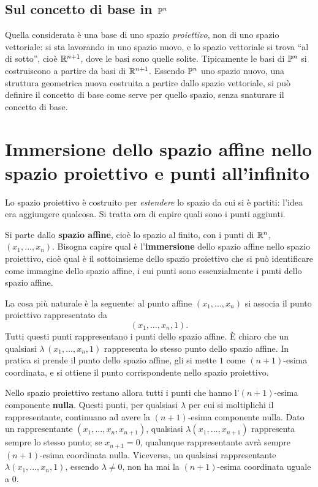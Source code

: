 \subsection{Sul concetto di base in $\mathbb{P}^n$}

Quella considerata è una base di uno spazio \emph{proiettivo}, non di uno spazio vettoriale: si sta lavorando in uno spazio nuovo, e lo spazio vettoriale si trova ``al di sotto'', cioè $\mathbb{R}^{n+1}$, dove le basi sono quelle solite. Tipicamente le basi di $\mathbb{P}^n$ si costruiscono a partire da basi di $\mathbb{R}^{n+1}$. Essendo $\mathbb{P}^n$ uno spazio nuovo, una struttura geometrica nuova costruita a partire dallo spazio vettoriale, si può definire il concetto di base come serve per quello spazio, senza snaturare il concetto di base.

\section{Immersione dello spazio affine nello spazio proiettivo e punti all'infinito}

Lo spazio proiettivo è costruito per \emph{estendere} lo spazio da cui si è partiti: l'idea era aggiungere qualcosa. Si tratta ora di capire quali sono i punti aggiunti.

Si parte dallo \textbf{spazio affine}, cioè lo spazio al finito, con i punti di $\mathbb{R}^n$, $(x_1,\dots,x_n)$. Bisogna capire qual è l'\textbf{immersione} dello spazio affine nello spazio proiettivo, cioè qual è il sottoinsieme dello spazio proiettivo che si può identificare come immagine dello spazio affine, i cui punti sono essenzialmente i punti dello spazio affine.

La cosa più naturale è la seguente: al punto affine $(x_1,\dots,x_n)$ si associa il punto proiettivo rappresentato da
\[
  (x_1,\dots,x_n,1).
\]
Tutti questi punti rappresentano i punti dello spazio affine. È chiaro che un qualsiasi $\lambda\,(x_1,\dots,x_n,1)$ rappresenta lo stesso punto dello spazio affine. In pratica si prende il punto dello spazio affine, gli si mette $1$ come $(n+1)$-esima coordinata, e si ottiene il punto corrispondente nello spazio proiettivo.

Nello spazio proiettivo restano allora tutti i punti che hanno l'$(n+1)$-esima componente \textbf{nulla}. Questi punti, per qualsiasi $\lambda$ per cui si moltiplichi il rappresentante, continuano ad avere la $(n+1)$-esima componente nulla. Dato un rappresentante $(x_1,\dots,x_n,x_{n+1})$, qualsiasi $\lambda(x_1,\dots,x_{n+1})$ rappresenta sempre lo stesso punto; se $x_{n+1}=0$, qualunque rappresentante avrà sempre $(n+1)$-esima coordinata nulla. Viceversa, un qualsiasi rappresentante $\lambda(x_1,\dots,x_n,1)$, essendo $\lambda\neq 0$, non ha mai la $(n+1)$-esima coordinata uguale a $0$.


